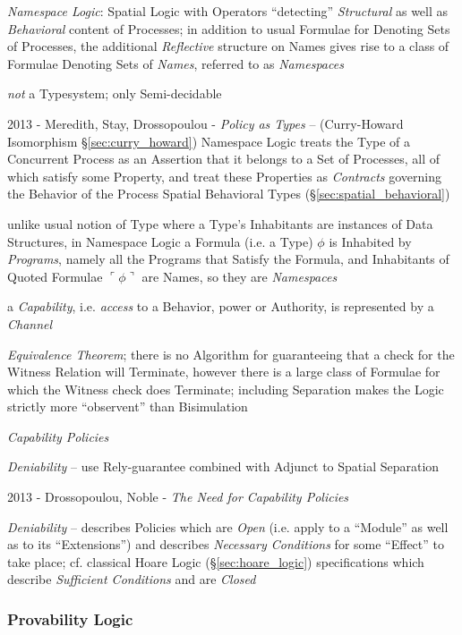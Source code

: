 \emph{Namespace Logic}: Spatial Logic with Operators ``detecting''
\emph{Structural} as well as \emph{Behavioral} content of Processes; in addition
to usual Formulae for Denoting Sets of Processes, the additional
\emph{Reflective} structure on Names gives rise to a class of Formulae Denoting
Sets of \emph{Names}, referred to as \emph{Namespaces}

\emph{not} a Typesystem; only Semi-decidable

\asterism

2013 - Meredith, Stay, Drossopoulou - \emph{Policy as Types} -- (Curry-Howard
Isomorphism \S\ref{sec:curry_howard}) Namespace Logic treats the Type of a
Concurrent Process as an Assertion that it belongs to a Set of Processes, all of
which satisfy some Property, and treat these Properties as \emph{Contracts}
governing the Behavior of the Process \fist Spatial Behavioral Types
(\S\ref{sec:spatial_behavioral})

unlike usual notion of Type where a Type's Inhabitants are instances of Data
Structures, in Namespace Logic a Formula (i.e. a Type) $\phi$ is Inhabited by
\emph{Programs}, namely all the Programs that Satisfy the Formula, and
Inhabitants of Quoted Formulae $\ulcorner\phi\urcorner$ are Names, so
they are \emph{Namespaces}

a \emph{Capability}, i.e. \emph{access} to a Behavior, power or Authority, is
represented by a \emph{Channel}

\emph{Equivalence Theorem}; there is no Algorithm for guaranteeing that a check
for the Witness Relation will Terminate, however there is a large class of
Formulae for which the Witness check does Terminate; including Separation makes
the Logic strictly more ``observent'' than Bisimulation

\emph{Capability Policies}

\emph{Deniability} -- use Rely-guarantee combined with Adjunct to Spatial
Separation

2013 - Drossopoulou, Noble - \emph{The Need for Capability Policies}

\emph{Deniability} -- describes Policies which are \emph{Open} (i.e. apply to a
``Module'' as well as to its ``Extensions'') and describes \emph{Necessary
  Conditions} for some ``Effect'' to take place; cf. classical Hoare Logic
(\S\ref{sec:hoare_logic}) specifications which describe \emph{Sufficient
  Conditions} and are \emph{Closed}



\subsubsection{Provability Logic}\label{sec:provability_logic}

